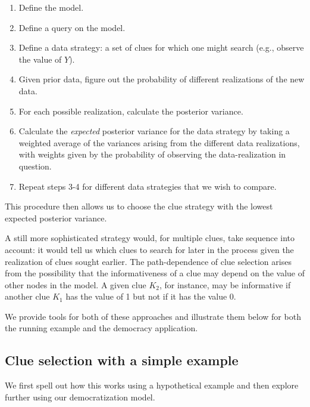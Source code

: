 \documentclass[
  12pt,
]{book}
\providecommand{\tightlist}{%
  \setlength{\itemsep}{0pt}\setlength{\parskip}{0pt}}
\begin{document}
\begin{enumerate}
\def\labelenumi{\arabic{enumi}.}
\tightlist
\item
  Define the model.
\item
  Define a query on the model.
\item
  Define a data strategy: a set of clues for which one might search (e.g., observe the value of \(Y\)).
\item
  Given prior data, figure out the probability of different realizations of the new data.
\item
  For each possible realization, calculate the posterior variance.
\item
  Calculate the \emph{expected} posterior variance for the data strategy by taking a weighted average of the variances arising from the different data realizations, with weights given by the probability of observing the data-realization in question.
\item
  Repeat steps 3-4 for different data strategies that we wish to compare.
\end{enumerate}

This procedure then allows us to choose the clue strategy with the lowest expected posterior variance.

A still more sophisticated strategy would, for multiple clues, take sequence into account: it would tell us which clues to search for later in the process given the realization of clues sought earlier. The path-dependence of clue selection arises from the possibility that the informativeness of a clue may depend on the value of other nodes in the model. A given clue \(K_2\), for instance, may be informative if another clue \(K_1\) has the value of 1 but not if it has the value 0.

We provide tools for both of these approaches and illustrate them below for both the running example and the democracy application.

\hypertarget{clue-selection-with-a-simple-example}{%
\subsection{Clue selection with a simple example}\label{clue-selection-with-a-simple-example}}

We first spell out how this works using a hypothetical example and then explore further using our democratization model.
\end{document}
